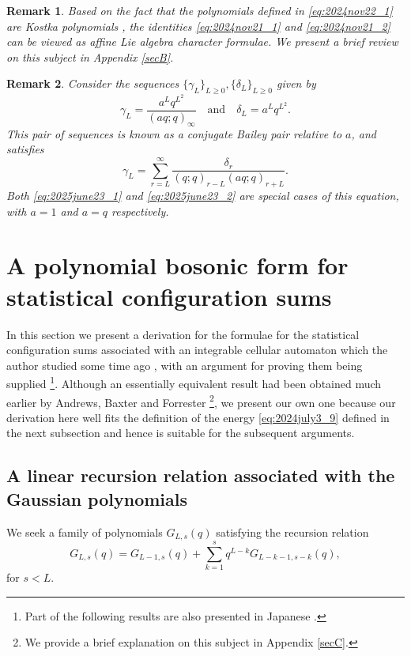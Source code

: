 \documentclass[sn-mathphys-num]{sn-jnl}%
\theoremstyle{thmstyleone}%
\theoremstyle{thmstyletwo}%
\newtheorem{remark}{Remark}%
\theoremstyle{thmstylethree}%
\begin{document}
{
\begin{remark}
Based on the fact that the polynomials defined in \eqref{eq:2024nov22_1} are
Kostka polynomials \cite{Warnaar2001, Warnaar2004},
the identities \eqref{eq:2024nov21_1} and \eqref{eq:2024nov21_2} 
can be viewed as affine Lie algebra 
character formulae. We present a brief review on this subject in Appendix \ref{secB}.
\end{remark}
\begin{remark}
Consider the sequences $\{ \gamma_L \}_{L \geq 0}, \{ \delta_L \}_{L \geq 0}$
given by
\begin{equation*}
\gamma_L = \frac{a^L q^{L^2}}{(aq;q)_\infty} \quad \mbox{and} \quad
\delta_L = a^L q^{L^2}.
\end{equation*}
This pair of sequences is known as a conjugate 
Bailey pair \cite{Warnaar2001, SW2002} relative to $a$,
and satisfies
\begin{equation*}
\gamma_L = \sum_{r=L}^\infty \frac{\delta_r}{(q;q)_{r-L} (aq;q)_{r+L}}. 
\end{equation*}
Both \eqref{eq:2025june23_1} and \eqref{eq:2025june23_2} are special cases of
this equation, with $a=1$ and $a=q$ respectively.
\end{remark}
}

\section{A polynomial bosonic form for statistical configuration sums}\label{sec4}
In this section we present {a derivation for} 
the formulae for the statistical configuration sums
associated with an integrable cellular automaton
which the author studied some time ago \cite{Takagi1}, 
with an argument for proving them being supplied
\footnote{Part of the following results are also presented in Japanese \cite{Takagi2025}.}.
{Although an essentially equivalent result had been obtained much earlier 
by Andrews, Baxter and Forrester \cite{ABF}\footnote{We provide a brief explanation on this subject in Appendix  \ref{secC}.}, 
we present our own one 
because our derivation here well fits the definition
of the energy \eqref{eq:2024july3_9} defined in the next subsection and hence is suitable for
the subsequent arguments.}
\subsection{A linear recursion relation associated with the Gaussian polynomials}
We seek a family of polynomials $G_{L,s}(q)$ satisfying
the recursion relation
\begin{equation} \label{eq:may13_2}
G_{L,s}(q) = G_{L-1,s}(q) + \sum_{k=1}^s q^{L-k}
G_{L-k-1,s-k}(q),
\end{equation}
for $s<L$.
\end{document}
